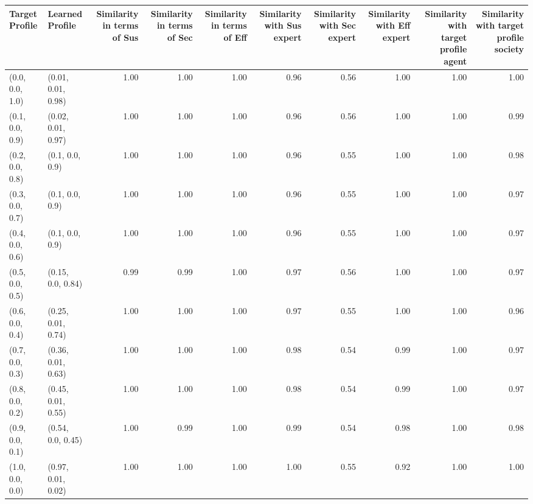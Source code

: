\begin{tabular}{llrrrrrrrr}
\toprule
Target Profile & Learned Profile & Similarity in terms of Sus & Similarity in terms of Sec & Similarity in terms of Eff & Similarity with Sus expert & Similarity with Sec expert & Similarity with Eff expert & Similarity with target profile agent & Similarity with target profile society \\
\midrule
(0.0, 0.0, 1.0) & (0.01, 0.01, 0.98) & 1.00 & 1.00 & 1.00 & 0.96 & 0.56 & 1.00 & 1.00 & 1.00 \\
(0.1, 0.0, 0.9) & (0.02, 0.01, 0.97) & 1.00 & 1.00 & 1.00 & 0.96 & 0.56 & 1.00 & 1.00 & 0.99 \\
(0.2, 0.0, 0.8) & (0.1, 0.0, 0.9) & 1.00 & 1.00 & 1.00 & 0.96 & 0.55 & 1.00 & 1.00 & 0.98 \\
(0.3, 0.0, 0.7) & (0.1, 0.0, 0.9) & 1.00 & 1.00 & 1.00 & 0.96 & 0.55 & 1.00 & 1.00 & 0.97 \\
(0.4, 0.0, 0.6) & (0.1, 0.0, 0.9) & 1.00 & 1.00 & 1.00 & 0.96 & 0.55 & 1.00 & 1.00 & 0.97 \\
(0.5, 0.0, 0.5) & (0.15, 0.0, 0.84) & 0.99 & 0.99 & 1.00 & 0.97 & 0.56 & 1.00 & 1.00 & 0.97 \\
(0.6, 0.0, 0.4) & (0.25, 0.01, 0.74) & 1.00 & 1.00 & 1.00 & 0.97 & 0.55 & 1.00 & 1.00 & 0.96 \\
(0.7, 0.0, 0.3) & (0.36, 0.01, 0.63) & 1.00 & 1.00 & 1.00 & 0.98 & 0.54 & 0.99 & 1.00 & 0.97 \\
(0.8, 0.0, 0.2) & (0.45, 0.01, 0.55) & 1.00 & 1.00 & 1.00 & 0.98 & 0.54 & 0.99 & 1.00 & 0.97 \\
(0.9, 0.0, 0.1) & (0.54, 0.0, 0.45) & 1.00 & 0.99 & 1.00 & 0.99 & 0.54 & 0.98 & 1.00 & 0.98 \\
(1.0, 0.0, 0.0) & (0.97, 0.01, 0.02) & 1.00 & 1.00 & 1.00 & 1.00 & 0.55 & 0.92 & 1.00 & 1.00 \\
\bottomrule
\end{tabular}
